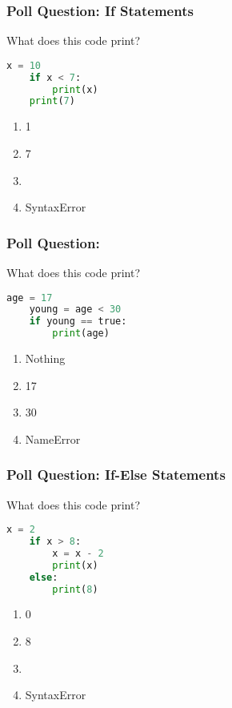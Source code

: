 \documentclass{beamer}
\begin{document}
%
%
\begin{frame}[fragile]
	\frametitle{Poll Question: If Statements}
	What does this code print?
	\begin{lstlisting}[language=Python, autogobble]
	x = 10
	if x < 7:
		print(x) 
	print(7)
	\end{lstlisting}
	\vfill
	\begin{enumerate}[A]
		\item 1
		\item 7
		\item {}
		\item SyntaxError
	\end{enumerate}
\end{frame}

%
%
\begin{frame}[fragile]
	\frametitle{Poll Question: }
	What does this code print?
	\begin{lstlisting}[language=Python, autogobble]
	age = 17
	young = age < 30
	if young == true:
		print(age)
	\end{lstlisting}
	\vfill
	\begin{enumerate}[A]
		\item Nothing
		\item 17
		\item 30
		\item NameError
	\end{enumerate}
\end{frame}

%
%
\begin{frame}[fragile]
	\frametitle{Poll Question: If-Else Statements}
	What does this code print?
	\begin{lstlisting}[language=Python, autogobble]
	x = 2
	if x > 8:
		x = x - 2
		print(x)
	else:
		print(8)
	\end{lstlisting}
	\vfill
	\begin{enumerate}[A]
		\item 0
		\item 8
		\item {}
		\item SyntaxError
	\end{enumerate}
\end{frame}

%
%
\end{document}
